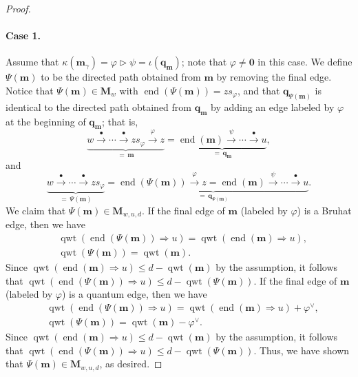 \documentclass[11pt,a4paper,reqno,dvipdfmx]{amsart}
\numberwithin{equation}{section}
\newcommand{\vp}{\varphi}
\newcommand{\bm}{\mathbf{m}}
\newcommand{\bq}{\mathbf{q}}
\newcommand{\bM}{\mathbf{M}}
\newcommand{\bzero}{\mathbf{0}}
\DeclareMathOperator{\qwt}{qwt}
\DeclareMathOperator{\ed}{end}
\newcommand{\edge}[1]{ \xrightarrow{\hspace{2pt}#1\hspace{2pt}} }
\theoremstyle{plain}
\theoremstyle{definition}
\theoremstyle{remark}
\begin{document}
\begin{proof}
\paragraph{\bf Case 1.}
%
Assume that $\kappa(\bm_{\gamma}) = \vp \rhd \psi = \iota(\bq_{\bm})$; 
note that $\vp \ne \bzero$ in this case.  
We define $\Psi(\bm)$ to be the directed path obtained from $\bm$ by removing the final edge.
Notice that $\Psi(\bm) \in \bM_{w}$ with $\ed(\Psi(\bm))=zs_{\vp}$, and that 
$\bq_{\Psi(\bm)}$ is identical to the directed path obtained 
from $\bq_{\bm}$ by adding an edge labeled by $\vp$ at the beginning of $\bq_{\bm}$; 
that is, 
%
\begin{equation*}
\underbrace{w \edge{\bullet} \cdots \edge{\bullet} zs_{\vp} \edge{\vp} z}_{= \, \bm} = 
\underbrace{\ed(\bm) \edge{\psi} \cdots \edge{\bullet} u}_{= \, \bq_{\bm}}, 
\end{equation*}
%
and
%
\begin{equation*}
\underbrace{w \edge{\bullet} \cdots \edge{\bullet} zs_{\vp}}_{= \, \Psi(\bm)} = 
\underbrace{\ed(\Psi(\bm)) \edge{\vp} z = \ed(\bm) \edge{\psi} \cdots \edge{\bullet} u}_{= \, 
\bq_{\Psi(\bm)}}. 
\end{equation*}
%
We claim that $\Psi(\bm) \in \bM_{w,u,d}$. 
If the final edge of $\bm$ (labeled by $\vp$) is a Bruhat edge, then we have
%
\begin{equation} \label{eq:case1a}
%
\begin{split}
& \qwt(\ed(\Psi(\bm)) \Rightarrow u) = \qwt(\ed(\bm) \Rightarrow u), \\
& \qwt(\Psi(\bm)) = \qwt(\bm).
\end{split}
%
\end{equation}
%
Since $\qwt(\ed(\bm) \Rightarrow u) \le d - \qwt(\bm)$ by the assumption, 
it follows that $\qwt(\ed(\Psi(\bm)) \Rightarrow u) \le d - \qwt(\Psi(\bm))$. 
If the final edge of $\bm$ (labeled by $\vp$) is 
a quantum edge, then we have
%
\begin{equation} \label{eq:case1b}
%
\begin{split}
& \qwt(\ed(\Psi(\bm)) \Rightarrow u) = 
  \qwt(\ed(\bm) \Rightarrow u) + \vp^{\vee}, \\
& \qwt(\Psi(\bm)) = \qwt(\bm) - \vp^{\vee}.
\end{split}
%
\end{equation}
%
Since $\qwt(\ed(\bm) \Rightarrow u) \le d - \qwt(\bm)$ by the assumption, 
it follows that $\qwt(\ed(\Psi(\bm)) \Rightarrow u) \le d - \qwt(\Psi(\bm))$. 
Thus, we have shown that $\Psi(\bm) \in \bM_{w,u,d}$, as desired. 

\end{proof}
\end{document}
